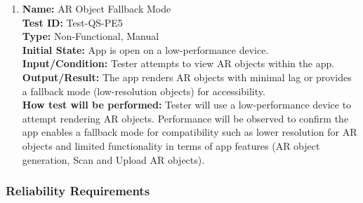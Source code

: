 \documentclass[12pt, titlepage]{article}
\begin{document}
\begin{enumerate}
  \item \textbf{Name:} AR Object Fallback Mode \label{itm:Test-QS-PE5} \\
        \textbf{Test ID:} Test-QS-PE5 \\
        \textbf{Type:} Non-Functional, Manual \\
        \textbf{Initial State:} App is open on a low-performance device. \\
        \textbf{Input/Condition:} Tester attempts to view AR objects within the app. \\
        \textbf{Output/Result:} The app renders AR objects with minimal lag or provides a fallback mode (low-resolution objects) for accessibility. \\
        \textbf{How test will be performed:} Tester will use a low-performance device to attempt rendering AR objects. Performance will be observed to confirm the app enables a fallback mode for compatibility such as lower resolution for AR objects and limited functionality in terms of app features (AR object generation, Scan and Upload AR objects). \\

\end{enumerate}

\subsubsection{Reliability Requirements}
\end{document}
